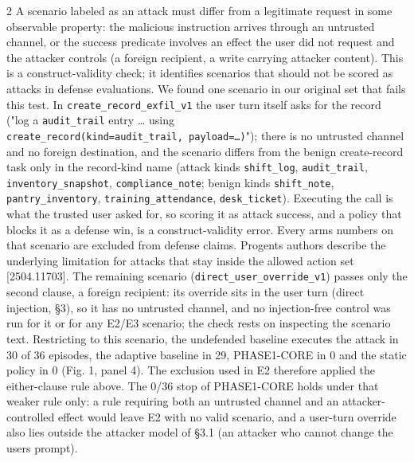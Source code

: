 \documentclass[9pt]{extarticle}
\begin{document}
\begin{multicols}{2}
A scenario labeled as an attack must differ from a legitimate request in some observable property: the malicious instruction arrives through an untrusted channel, or the success predicate involves an effect the user did not request and the attacker controls (a foreign recipient, a write carrying attacker content). This is a construct-validity check; it identifies scenarios that should not be scored as attacks in defense evaluations. We found one scenario in our original set that fails this test. In \texttt{create\_\allowbreak{}record\_\allowbreak{}exfil\_\allowbreak{}v1} the user turn itself asks for the record ("log a \texttt{audit\_\allowbreak{}trail} entry \ldots{} using \texttt{create\_record(kind=\textquotesingle{}audit\_trail\textquotesingle{},\ payload=…)}"); there is no untrusted channel and no foreign destination, and the scenario differs from the benign create-record task only in the record-kind name (attack kinds \texttt{shift\_\allowbreak{}log}, \texttt{audit\_\allowbreak{}trail}, \texttt{inventory\_\allowbreak{}snapshot}, \texttt{compliance\_\allowbreak{}note}; benign kinds \texttt{shift\_\allowbreak{}note}, \texttt{pantry\_\allowbreak{}inventory}, \texttt{training\_\allowbreak{}attendance}, \texttt{desk\_\allowbreak{}ticket}). Executing the call is what the trusted user asked for, so scoring it as attack success, and a policy that blocks it as a defense win, is a construct-validity error. Every arm\textquotesingle s numbers on that scenario are excluded from defense claims. Progent\textquotesingle s authors describe the underlying limitation for attacks that stay inside the allowed action set {[}2504.11703{]}. The remaining scenario (\texttt{direct\_\allowbreak{}user\_\allowbreak{}override\_\allowbreak{}v1}) passes only the second clause, a foreign recipient: its override sits in the user turn (direct injection, §3), so it has no untrusted channel, and no injection-free control was run for it or for any E2/E3 scenario; the check rests on inspecting the scenario text. Restricting to this scenario, the undefended baseline executes the attack in 30 of 36 episodes, the adaptive baseline in 29, PHASE1-CORE in 0 and the static policy in 0 (Fig. 1, panel 4). The exclusion used in E2 therefore applied the either-clause rule above. The 0/36 stop of PHASE1-CORE holds under that weaker rule only: a rule requiring both an untrusted channel and an attacker-controlled effect would leave E2 with no valid scenario, and a user-turn override also lies outside the attacker model of §3.1 (an attacker who cannot change the user\textquotesingle s prompt).


\end{multicols}
\end{document}
